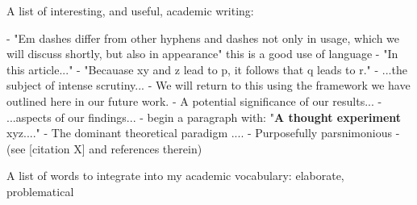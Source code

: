 A list of interesting, and useful, academic writing:

- "Em dashes differ from other hyphens and dashes not only in usage, which we will discuss shortly, but also in appearance" this is a good use of language
- "In this article..."
- "Becauase xy and z lead to p, it follows that q leads to r."
- ...the subject of intense scrutiny...
- We will return to this using the framework we have outlined here in our future work.
- A potential significance of our results...
- ...aspects of our findings...
- begin a paragraph with: "\textbf{A thought experiment} xyz...." 
- The dominant theoretical paradigm ....
- Purposefully parsnimonious 
- (see [citation X] and references therein)

A list of words to integrate into my academic vocabulary: elaborate, problematical